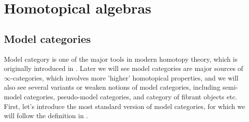 \documentclass[12pt]{amsart}
\theoremstyle{definition}
\theoremstyle{remark}
\numberwithin{equation}{section}
\newcommand{\1}{{\mathbb{1}}}
\begin{document}
\section{Homotopical algebras}


\subsection{Model categories}

Model category is one of the major tools in modern homotopy theory, which is originally introduced in \cite{Qui67}. Later we will see model categories are major sources of $\infty$-categories, which involves more 'higher' homotopical properties, and we will also see several variants or weaken notions of model categories, including semi-model categories, pseudo-model categories, and category of fibrant objects etc. First, let's introduce the most standard version of model categories, for which we will follow the definition in \cite{Hov07}.
\end{document}
